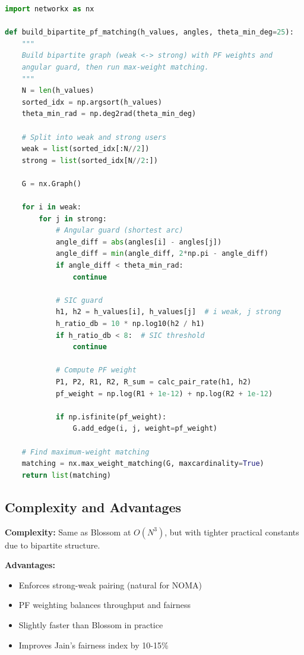 \begin{lstlisting}[language=Python, caption={Bipartite PF Matching using NetworkX}]
import networkx as nx

def build_bipartite_pf_matching(h_values, angles, theta_min_deg=25):
    """
    Build bipartite graph (weak <-> strong) with PF weights and 
    angular guard, then run max-weight matching.
    """
    N = len(h_values)
    sorted_idx = np.argsort(h_values)
    theta_min_rad = np.deg2rad(theta_min_deg)
    
    # Split into weak and strong users
    weak = list(sorted_idx[:N//2])
    strong = list(sorted_idx[N//2:])
    
    G = nx.Graph()
    
    for i in weak:
        for j in strong:
            # Angular guard (shortest arc)
            angle_diff = abs(angles[i] - angles[j])
            angle_diff = min(angle_diff, 2*np.pi - angle_diff)
            if angle_diff < theta_min_rad:
                continue
            
            # SIC guard
            h1, h2 = h_values[i], h_values[j]  # i weak, j strong
            h_ratio_db = 10 * np.log10(h2 / h1)
            if h_ratio_db < 8:  # SIC threshold
                continue
            
            # Compute PF weight
            P1, P2, R1, R2, R_sum = calc_pair_rate(h1, h2)
            pf_weight = np.log(R1 + 1e-12) + np.log(R2 + 1e-12)
            
            if np.isfinite(pf_weight):
                G.add_edge(i, j, weight=pf_weight)
    
    # Find maximum-weight matching
    matching = nx.max_weight_matching(G, maxcardinality=True)
    return list(matching)
\end{lstlisting}

\subsection{Complexity and Advantages}

\textbf{Complexity:} Same as Blossom at $O(N^3)$, but with tighter practical constants due to bipartite structure.

\textbf{Advantages:}
\begin{itemize}
    \item Enforces strong-weak pairing (natural for NOMA)
    \item PF weighting balances throughput and fairness
    \item Slightly faster than Blossom in practice
    \item Improves Jain's fairness index by 10-15\%
\end{itemize}

